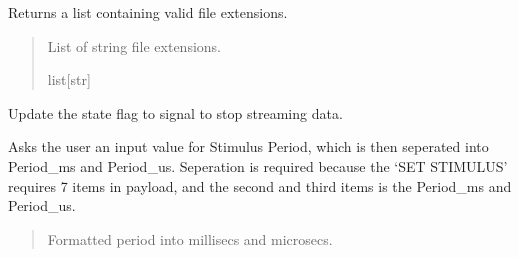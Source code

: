 \documentclass[letterpaper,10pt,english]{sphinxmanual}
\begin{document}
\begin{fulllineitems}
\begin{fulllineitems}
\end{fulllineitems}


\begin{fulllineitems}
\label{\detokenize{Setup_8480SC:Setup_8480SC.Setup_8480SC.GetSupportedFileExtensions}}
\pysigstartsignatures
{}
\pysigstopsignatures
\sphinxAtStartPar
Returns a list containing valid file extensions.
\begin{quote}\begin{description}
\sphinxAtStartPar
List of string file extensions.

\sphinxAtStartPar
list{[}str{]}

\end{description}\end{quote}

\end{fulllineitems}


\begin{fulllineitems}
\label{\detokenize{Setup_8480SC:Setup_8480SC.Setup_8480SC.StopStream}}
\pysigstartsignatures
{}
\pysigstopsignatures
\sphinxAtStartPar
Update the state flag to signal to stop streaming data.

\end{fulllineitems}


\begin{fulllineitems}
\label{\detokenize{Setup_8480SC:Setup_8480SC.Setup_8480SC._ChoosePeriod}}
\pysigstartsignatures
{}
\pysigstopsignatures
\sphinxAtStartPar
Asks the user an input value for Stimulus Period, which is then seperated into Period\_ms and Period\_us.            Seperation is required because the ‘SET STIMULUS’ requires 7 items in payload, and the second and third items            is the Period\_ms and Period\_us.
\begin{quote}\begin{description}
\sphinxAtStartPar
Formatted period into millisecs and microsecs.


\end{description}
\end{quote}
\end{fulllineitems}
\end{fulllineitems}
\end{document}

